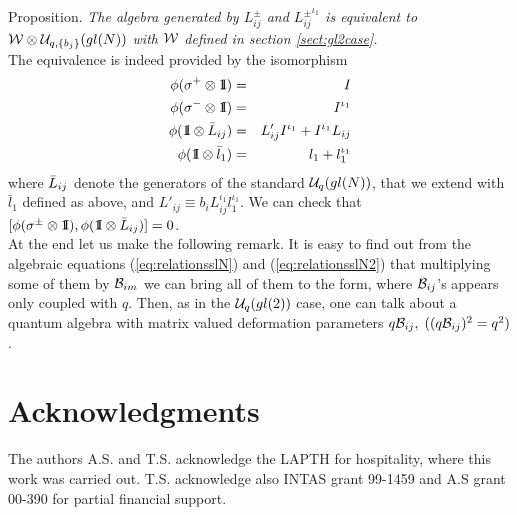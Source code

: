 \documentclass[a4paper,a4paper]{article}
\newcommand{\un}{\mbox{1\hspace{-1mm}I}}
\begin{document}
\medskip

\noindent
{\large \sc Proposition.} 
\textsl{
The algebra generated by ${L_{ij}^\pm}$ and ${L_{ij}^\pm}^{\iota_1}$
is equivalent to 
${\cal W}\otimes {\cal U}_{q,\{b_j\}}(gl(N))$
with ${\cal W}$ defined in section \ref{sect:gl2case}.
}
\\
The equivalence is indeed provided by the isomorphism 
\begin{eqnarray}
  \label{eq:eq:isomPhi}
  \phi(\sigma^+ \otimes \un) &=& I \\
  \phi(\sigma^- \otimes \un) &=& I^{\iota_1} \\
  \phi(\un \otimes \bL_{ij}) &=& L'_{ij }I^{\iota_1} + I^{\iota_1} L_{ij }\\
  \phi(\un \otimes \bar l_1) &=& l_1 + l_1^{\iota_1}
\end{eqnarray}
where ${\bar L}_{ij}$ 
denote the generators of the standard ${\cal U}_{q}(gl(N))$, that we extend 
with  $\bar l_1$ defined as above, 
and $L'_{ij}\equiv b_i L_{ij}^{\iota_1} l_1^{\iota_1}$.
We can check that 
$[\phi(\sigma^\pm \otimes \un),\phi(\un \otimes \bL_{ij})]=0$. 
\medskip
\\
At the end let us make the following remark. It is easy to find out
from the algebraic equations (\ref{eq:relationsslN})
and (\ref{eq:relationsslN2}) that  multiplying some of them by  
${\cal B}_{im}$ we can bring all of them to the form, where ${\cal B}_{ij}$'s
appears only  coupled with $q$. Then, as in the ${\cal U}_q(gl(2))$
case, one can talk about a quantum algebra with matrix valued
deformation parameters
$q {\cal B}_{ij}, \; ((q {\cal B}_{ij})^2 = q^2)$.


\section{Acknowledgments}
\setcounter{equation}{0}

\indent

The authors A.S. and T.S. acknowledge the LAPTH for hospitality,
where this work was carried out. T.S. acknowledge also INTAS
grant 99-1459 and A.S grant 00-390 for partial financial support.
  
\end{document}

